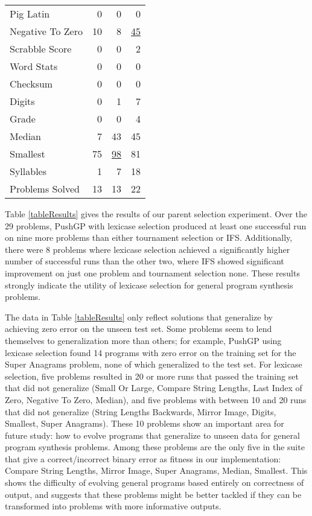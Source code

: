 \documentclass{sig-alternate}
\begin{document}
\begin{table}[t]
\begin{tabular}{lrrr}
Pig Latin                  & 0       & 0   & 0        \\
Negative To Zero           & 10      & 8   & \underline{45}       \\
Scrabble Score             & 0       & 0   & 2        \\
Word Stats                 & 0       & 0   & 0        \\
Checksum                   & 0       & 0   & 0        \\
Digits                     & 0       & 1   & 7        \\
Grade                      & 0       & 0   & 4        \\
Median                     & 7       & 43  & 45       \\
Smallest                   & 75      & \underline{98}  & 81       \\
Syllables                  & 1       & 7   & 18       \\
\midrule
\rowcolor{white} Problems Solved          & 13       & 13      & 22   \\
\bottomrule
\end{tabular}
\end{table}


Table \ref{tableResults} gives the results of our parent selection experiment. Over the 29 problems, PushGP with lexicase selection produced at least one successful run on nine more problems than either tournament selection or IFS.
Additionally, there were 8 problems where lexicase selection achieved a significantly higher number of successful runs than the other two, where IFS showed significant improvement on just one problem and tournament selection none. These results strongly indicate the utility of lexicase selection for general program synthesis problems.

The data in Table \ref{tableResults} only reflect solutions that generalize by achieving zero error on the unseen test set. Some problems seem to lend themselves to generalization more than others; for example, PushGP using lexicase selection found 14 programs with zero error on the training set for the Super Anagrams problem, none of which generalized to the test set. For lexicase selection, five problems resulted in 20 or more runs that passed the training set that did not generalize (Small Or Large,
Compare String Lengths,
Last Index of Zero,
Negative To Zero,
Median),
and five problems with between 10 and 20 runs that did not generalize (String Lengths Backwards,
Mirror Image,
Digits,
Smallest,
Super Anagrams).
These 10 problems show an important area for future study: how to evolve programs that generalize to unseen data for general program synthesis problems. Among these problems are the only five in the suite that give a correct/incorrect binary error as fitness in our implementation: Compare String Lengths, Mirror Image, Super Anagrams, Median, Smallest. This shows the difficulty of evolving general programs based entirely on correctness of output, and suggests that these problems might be better tackled if they can be transformed into problems with more informative outputs.
\end{document}
